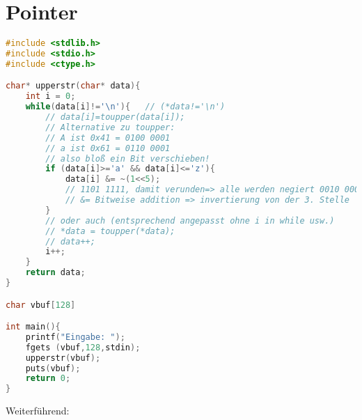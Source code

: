\section{Pointer}

\begin{lstlisting}[language=C]
#include <stdlib.h>
#include <stdio.h>
#include <ctype.h>

char* upperstr(char* data){
	int i = 0;	
	while(data[i]!='\n'){	// (*data!='\n')
		// data[i]=toupper(data[i]);
		// Alternative zu toupper: 
		// A ist 0x41 = 0100 0001
		// a ist 0x61 = 0110 0001
		// also bloß ein Bit verschieben!
		if (data[i]>='a' && data[i]<='z'){
			data[i] &= ~(1<<5); 
			// 1101 1111, damit verunden=> alle werden negiert 0010 0000
			// &= Bitweise addition => invertierung von der 3. Stelle
		}
		// oder auch (entsprechend angepasst ohne i in while usw.)
		// *data = toupper(*data);
		// data++;
		i++;
	}
	return data;
}

char vbuf[128]

int main(){
	printf("Eingabe: ");
	fgets (vbuf,128,stdin);
	upperstr(vbuf);
	puts(vbuf);
	return 0;
}

\end{lstlisting}
Weiterführend:
